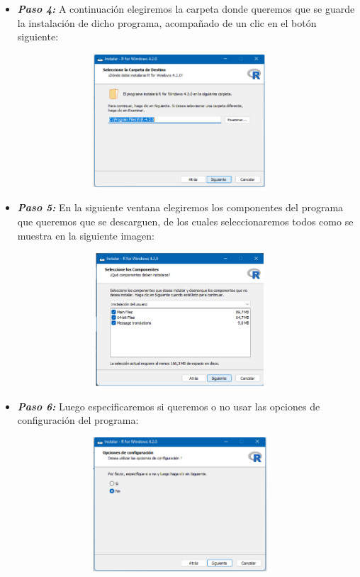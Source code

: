 \documentclass{article}
\begin{document}
\begin{itemize}
\item \textbf{\textit{Paso 4: }} A continuación elegiremos la carpeta donde queremos que se guarde la instalación de dicho programa, acompañado de un clic en el botón siguiente:
\begin{figure}[H]
\centering
\includegraphics[width=10cm,height=5cm]{imagenes/Paso4.png}
\caption{\label{fig3}}
\end{figure}
\item \textbf{\textit{Paso 5: }}En la siguiente ventana elegiremos los componentes del programa que queremos que se descarguen, de los cuales seleccionaremos todos como se muestra en la siguiente imagen:
\begin{figure}[H]
\centering
\includegraphics[width=10cm,height=5cm]{imagenes/Paso5.png}
\caption{\label{fig4}}
\end{figure}
\item \textbf{\textit{Paso 6: }}Luego especificaremos si queremos o no usar las opciones de configuración del programa:
\begin{figure}[H]
\centering
\includegraphics[width=10cm,height=5cm]{imagenes/Paso6.png}

\end{figure}
\end{itemize}
\end{document}
